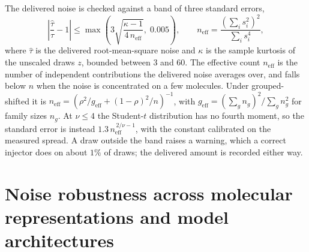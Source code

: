 \label{app:add:dose_tolerance}
The delivered noise is checked against a band of three
standard errors,
\begin{equation}
\left|\frac{\hat{\tau}}{\tau} - 1\right| \le \max\!\left(3\sqrt{\frac{\kappa - 1}{4\,n_{\mathrm{eff}}}},\; 0.005\right),
\qquad
n_{\mathrm{eff}} = \frac{\left(\sum_i s_i^2\right)^2}{\sum_i s_i^4},
\label{eq:dose_tolerance}
\end{equation}
where $\hat{\tau}$ is the delivered root-mean-square noise and $\kappa$ is the sample kurtosis of the
unscaled draws $z$, bounded between 3 and 60. The effective count $n_{\mathrm{eff}}$ is the number of
independent contributions the delivered noise averages over, and falls below $n$ when the noise is
concentrated on a few molecules. Under grouped-shifted it is
$n_{\mathrm{eff}} = \left(\rho^2/g_{\mathrm{eff}} + (1-\rho)^2/n\right)^{-1}$, with
$g_{\mathrm{eff}} = \left(\sum_g n_g\right)^2 / \sum_g n_g^2$ for family sizes $n_g$. At
$\nu \le 4$ the Student-$t$ distribution has no fourth moment, so the standard error is instead
$1.3\,n_{\mathrm{eff}}^{\,2/\nu - 1}$, with the constant calibrated on the measured spread. A draw
outside the band raises a warning, which a correct injector does on about $1\%$ of draws; the delivered amount is recorded either way.

\section{Noise robustness across molecular representations and model architectures}\label{app:add:robustness}
\newcommand{\AFtablefont}{\renewcommand{\small}{\scriptsize}\setlength{\tabcolsep}{3pt}\captionsetup{font=footnotesize}}

